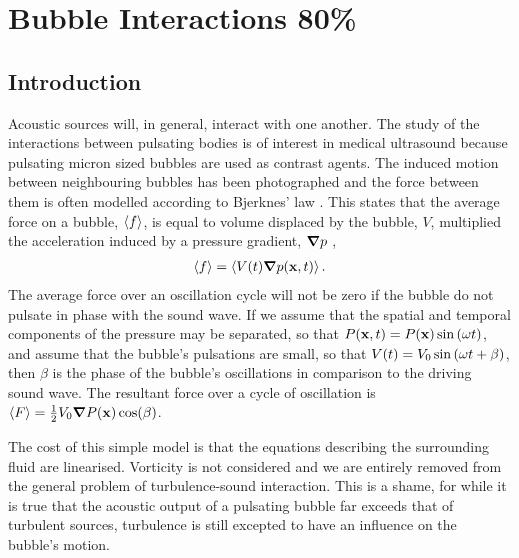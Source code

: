 \chapter{Bubble Interactions 80\%}
\section{Introduction}

Acoustic sources will, in general, interact with one another. %
The study of the interactions between pulsating bodies
is of  interest in medical ultrasound because pulsating micron sized bubbles are used as contrast agents.
The induced motion  between neighbouring bubbles has been photographed
and the force between them is often  modelled according to Bjerknes' law  \cite{Crum1971}.
This states that the average force on a bubble, $\left< f \right>$, is
equal to volume displaced by the bubble, $ V$, multiplied the acceleration 
induced by a pressure gradient, $\mbox{\boldmath $\nabla$} p$ \cite{Bjerknes1905,Crum1971, Leighton1990},
\begin{align}
  \label{eqn:Bjerknes}
  \left< f \right> = \left< V(t)\mbox{\boldmath $\nabla$} p(\mathbf{x}, t) \right>.
\end{align}
The  average force  over an oscillation cycle will not be zero if the bubble do not pulsate in phase with the sound wave.
If we assume that the spatial and temporal components of the pressure may be separated, 
 so that  $P(\mathbf{x}, t) = P(\mathbf{x})\sin\left( \omega t \right)$,
 and assume that the bubble's pulsations are small, 
 so that $V(t) = V_0\sin\left( \omega t + \beta \right)$,
then 
$\beta$ is the phase of the bubble's oscillations in comparison to the driving sound wave.
The resultant force over a cycle of oscillation is 
 $\left< F \right> = \frac{1}{2}V_0\mbox{\boldmath $\nabla$} P(\mathbf{x}) \cos(\beta)$.

The  cost of this simple model is that the equations describing the surrounding fluid are linearised.
Vorticity is not considered and we are entirely removed from the general problem of 
turbulence-sound interaction.
This is a shame, for while it is true that the acoustic output of a pulsating bubble far exceeds that of turbulent sources,
turbulence is still excepted to have an influence on the bubble's motion.

